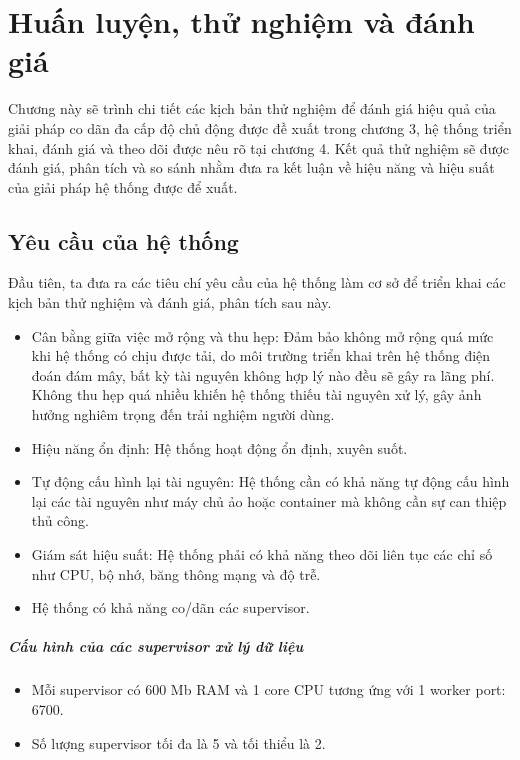 \chapter{Huấn luyện, thử nghiệm và đánh giá}

Chương này sẽ trình chi tiết các kịch bản thử nghiệm để đánh giá hiệu quả của giải pháp co dãn đa cấp độ chủ động được đề xuất trong chương 3, hệ thống triển khai, đánh giá và theo dõi được nêu rõ tại chương 4. Kết quả thử nghiệm sẽ được đánh giá, phân tích và so sánh nhằm đưa ra kết luận về hiệu năng và hiệu suất của giải pháp hệ thống được để xuất.

\section{Yêu cầu của hệ thống}

Đầu tiên, ta đưa ra các tiêu chí yêu cầu của hệ thống làm cơ sở để triển khai các kịch bản thử nghiệm và đánh giá, phân tích sau này.

\begin{itemize}
    \item Cân bằng giữa việc mở rộng và thu hẹp: Đảm bảo không mở rộng quá mức khi hệ thống có chịu được tải, do môi trường triển khai trên hệ thống điện đoán đám mây, bất kỳ tài nguyên không hợp lý nào đều sẽ gây ra lãng phí. Không thu hẹp quá nhiều khiến hệ thống thiếu tài nguyên xử lý, gây ảnh hưởng nghiêm trọng đến trải nghiệm người dùng.
    \item Hiệu năng ổn định: Hệ thống hoạt động ổn định, xuyên suốt.
    \item Tự động cấu hình lại tài nguyên: Hệ thống cần có khả năng tự động cấu hình lại các tài nguyên như máy chủ ảo hoặc container mà không cần sự can thiệp thủ công.
    \item Giám sát hiệu suất: Hệ thống phải có khả năng theo dõi liên tục các chỉ số như CPU, bộ nhớ, băng thông mạng và độ trễ.
    \item Hệ thống có khả năng co/dãn các supervisor.
\end{itemize}

\paragraph{Cấu hình của các supervisor xử lý dữ liệu}

\begin{itemize}
    \item Mỗi supervisor có 600 Mb RAM và 1 core CPU tương ứng với 1 worker port: 6700.
    \item Số lượng supervisor tối đa là 5 và tối thiểu là 2.
\end{itemize}

